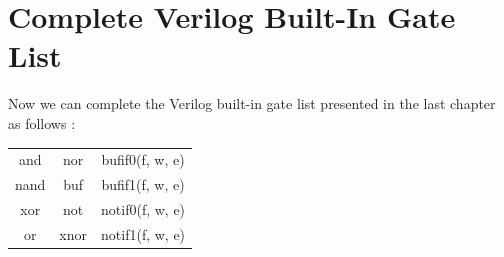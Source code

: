 \documentclass[12pt,openany]{book}
\begin{document}
\noindent
{}

\section{Complete Verilog Built-In Gate List}
Now we can complete the Verilog built-in gate list presented in the last chapter as follows :
\begin{center}
	\begin{tabular}{c|c|c}
		and  & nor & bufif0(f, w, e)  \\
		nand & buf & bufif1(f, w, e)  \\
		xor  & not & notif0(f, w, e) \\
		or   & xnor & notif1(f, w, e) \\
	\end{tabular}

\end{center}
\end{document}
